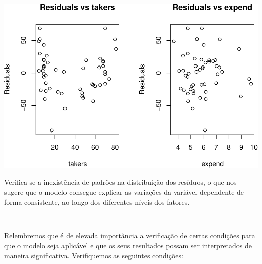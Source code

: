 \documentclass[]{article}
\begin{document}
\includegraphics{AEII_main_files/figure-latex/unnamed-chunk-38-1.pdf}

\begin{Shaded}
\begin{Highlighting}[]
\NormalTok{(} \NormalTok{(}\NormalTok{, }\NormalTok{))}
\end{Highlighting}
\end{Shaded}

Verifica-se a inexistência de padrões na distribuição dos resíduos, o
que nos sugere que o modelo consegue explicar as variações da variável
dependente de forma consistente, ao longo dos diferentes níveis dos
fatores.

\(\ \)

Relembremos que é de elevada importância a verificação de certas
condições para que o modelo seja aplicável e que os seus resultados
possam ser interpretados de maneira significativa. Verifiquemos as
seguintes condições:

\begin{Shaded}
\begin{Highlighting}[]
 \NormalTok{)}
\end{Highlighting}
\end{Shaded}
\end{document}
